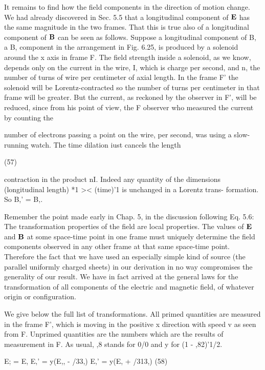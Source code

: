It remains to find how the field components in the direction of
motion change. We had already discovered in Sec. 5.5 that a longitudinal
component of $\mathbf{E}$ has the same magnitude in the two frames.
That this is true also of a longitudinal component of $\mathbf{B}$ can be seen
as follows. Suppose a longitudinal component of B, a B, component
in the arrangement in Fig. 6.25, is produced by a solenoid around the
x axis in frame F. The field strength inside a solenoid, as we know,
depends only on the current in the wire, I, which is charge per second,
and n, the number of turns of wire per centimeter of axial length.
In the frame F' the solenoid will be Lorentz-contracted so the number
of turns per centimeter in that frame will be greater. But the current,
as reckoned by the observer in F', will be reduced, since from his point
of view, the F observer who measured the current by counting the

number of electrons passing a point on the wire, per second, was
using a slow-running watch. The time dilation iust cancels the length

\begin{equation}
\end{equation}
(57)

contraction in the product nI. Indeed any quantity of the dimensions
(longitudinal length) *1 >< (time)'1 is unchanged in a Lorentz trans-
formation. So B,' = B,.

Remember the point made early in Chap. 5, in the discussion
following Eq. 5.6: The transformation properties of the field are local
properties. The values of $\mathbf{E}$ and $\mathbf{B}$ at some space-time point in one
frame must uniquely determine the field components observed in
any other frame at that same space-time point. Therefore the fact
that we have used an especially simple kind of source (the parallel
uniformly charged sheets) in our derivation in no way compromises
the generality of our result. We have in fact arrived at the general
laws for the transformation of all components of the electric and
magnetic field, of whatever origin or configuration.

We give below the full list of transformations. All primed
quantities are measured in the frame F', which is moving in the positive
x direction with speed v as seen from F. Unprimed quantities
are the numbers which are the results of measurement in F. As usual,
,8 stands for 0/0 and y for (1 - ,82)'1/2.

\begin{equation}
\end{equation}
E; = E, E,' = y(E,, - /33,) E,' = y(E, + /313,)
(58)

